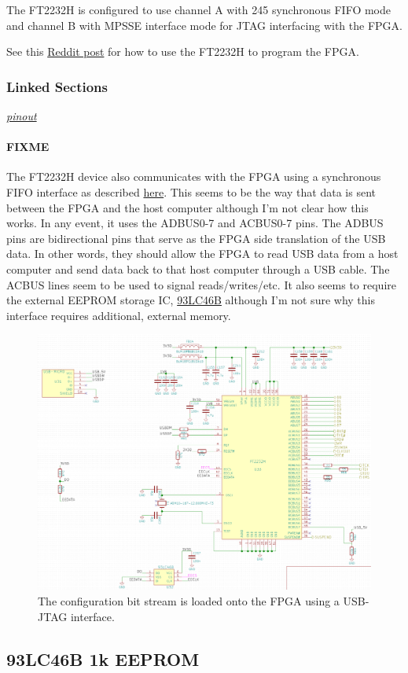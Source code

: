 The FT2232H is configured to use channel A with 245 synchronous FIFO mode and channel B with MPSSE
interface mode for JTAG interfacing with the FPGA\@.

See this
\href{https://www.reddit.com/r/FPGA/comments/4brday/confusion_regarding_jtag_and_ftdi_chips/}{Reddit
post} for how to use the FT2232H to program the FPGA\@.

\subsubsection{Linked Sections}
\label{sec:ft2232h-linked-sections}

\textit{\hyperref[sec:ft2232h-pinout]{pinout}}

\paragraph{FIXME} The FT2232H device also communicates with the FPGA using a synchronous FIFO
interface as described
\href{http://www.ftdichip.com/Support/Documents/AppNotes/AN_130_FT2232H_Used_In_FT245\%20Synchronous\%20FIFO\%20Mode.pdf}{here}. This
seems to be the way that data is sent between the FPGA and the host computer although I'm not clear
how this works. In any event, it uses the ADBUS0-7 and ACBUS0-7 pins. The ADBUS pins are
bidirectional pins that serve as the FPGA side translation of the USB data. In other words, they
should allow the FPGA to read USB data from a host computer and send data back to that host computer
through a USB cable. The ACBUS lines seem to be used to signal reads/writes/etc. It also seems to
require the external EEPROM storage IC,
\href{http://ww1.microchip.com/downloads/en/DeviceDoc/20001749K.pdf}{93LC46B} although I'm not sure
why this interface requires additional, external memory.

\begin{figure}[h]
        \centering
        \includegraphics[width=\textwidth]{data/usb-ft2232.png}
        \caption{The configuration bit stream is loaded onto the FPGA using a USB-JTAG interface.}
        \label{fig:usb-ft2232}
\end{figure}

\subsection{93LC46B 1k EEPROM}
\label{sec:93lc46b}

